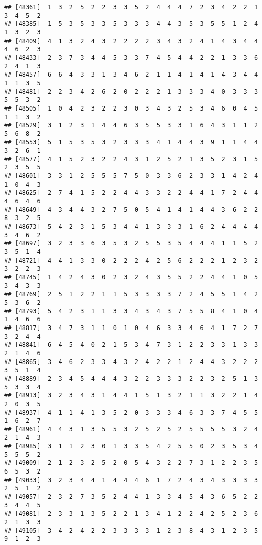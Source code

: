 \documentclass[
]{article}
\begin{document}
\begin{verbatim}
## [48361]  1  3  2  5  2  2  3  3  5  2  4  4  4  7  2  3  4  2  2  1  3  4  5  2
## [48385]  1  5  3  5  3  3  5  3  3  3  4  4  3  5  3  5  5  1  2  4  1  3  2  3
## [48409]  4  1  3  2  4  3  2  2  2  2  3  4  3  2  4  1  4  3  4  4  4  6  2  3
## [48433]  2  3  7  3  4  4  5  3  3  7  4  5  4  4  2  2  1  3  3  6  2  4  1  3
## [48457]  6  6  4  3  3  1  3  4  6  2  1  1  4  1  4  1  4  3  4  4  1  1  3  5
## [48481]  2  2  3  4  2  6  2  0  2  2  2  1  3  3  3  4  0  3  3  3  5  5  3  2
## [48505]  1  0  4  2  3  2  2  3  0  3  4  3  2  5  3  4  6  0  4  5  1  1  3  2
## [48529]  3  1  2  3  1  4  4  6  3  5  5  3  3  1  6  4  3  1  1  2  5  6  8  2
## [48553]  5  1  5  3  5  3  2  3  3  3  4  1  4  4  3  9  1  1  4  4  3  2  6  1
## [48577]  4  1  5  2  3  2  2  4  3  1  2  5  2  1  3  5  2  3  1  5  2  3  5  5
## [48601]  3  3  1  2  5  5  5  7  5  0  3  3  6  2  3  3  1  4  2  4  1  0  4  3
## [48625]  2  7  4  1  5  2  2  4  4  3  3  2  2  4  4  1  7  2  4  4  4  6  4  6
## [48649]  4  3  4  4  3  2  7  5  0  5  4  1  4  1  4  4  3  6  2  2  8  3  2  5
## [48673]  5  4  2  3  1  5  3  4  4  1  3  3  3  1  6  2  4  4  4  4  3  4  6  2
## [48697]  3  2  3  3  6  3  5  3  2  5  5  3  5  4  4  4  1  1  5  2  3  5  1  4
## [48721]  4  4  1  3  3  0  2  2  2  4  2  5  6  2  2  2  1  2  3  2  3  2  2  3
## [48745]  1  4  2  4  3  0  2  3  2  4  3  5  5  2  2  4  4  1  0  5  3  4  3  3
## [48769]  2  5  1  2  2  1  1  5  3  3  3  3  7  2  4  5  5  1  4  2  5  3  6  2
## [48793]  5  4  2  3  1  1  3  3  4  3  4  3  7  5  5  8  4  1  0  4  1  4  6  6
## [48817]  3  4  7  3  1  1  0  1  0  4  6  3  3  4  6  4  1  7  2  7  3  2  4  4
## [48841]  6  4  5  4  0  2  1  5  3  4  7  3  1  2  2  3  3  1  3  3  2  1  4  6
## [48865]  3  4  6  2  3  3  4  3  2  4  2  2  1  2  4  4  3  2  2  2  3  5  1  4
## [48889]  2  3  4  5  4  4  4  3  2  2  3  3  3  2  2  3  2  5  1  3  5  3  3  4
## [48913]  3  2  3  4  3  1  4  4  1  5  1  3  2  1  1  3  2  2  1  4  2  0  3  5
## [48937]  4  1  1  4  1  3  5  2  0  3  3  3  4  6  3  3  7  4  5  5  1  6  2  7
## [48961]  4  4  3  1  3  5  5  3  2  5  2  5  2  5  5  5  5  3  2  4  2  1  4  3
## [48985]  3  1  1  2  3  0  1  3  3  5  4  2  5  5  0  2  3  5  3  4  5  5  5  2
## [49009]  2  1  2  3  2  5  2  0  5  4  3  2  2  7  3  1  2  2  3  5  6  5  3  2
## [49033]  3  2  3  4  4  1  4  4  4  6  1  7  2  4  3  4  3  3  3  3  2  5  1  2
## [49057]  2  3  2  7  3  5  2  4  4  1  3  3  4  5  4  3  6  5  2  2  3  4  4  5
## [49081]  2  3  3  1  3  5  2  2  1  3  4  1  2  2  4  2  5  2  3  6  2  1  3  3
## [49105]  3  4  2  4  2  2  3  3  3  3  1  2  3  8  4  3  1  2  3  5  9  1  2  3

\end{verbatim}
\end{document}
